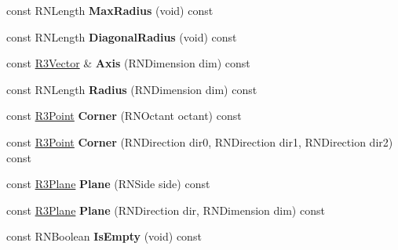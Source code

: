 \begin{DoxyCompactItemize}
\item 
const R\+N\+Length {\bfseries Max\+Radius} (void) const \hypertarget{class_r3_oriented_box_ad2d7be638bc52f27bc6592ad55dbe5e6}{}\label{class_r3_oriented_box_ad2d7be638bc52f27bc6592ad55dbe5e6}

\item 
const R\+N\+Length {\bfseries Diagonal\+Radius} (void) const \hypertarget{class_r3_oriented_box_ab749654a798015a22124ab60ae1599d0}{}\label{class_r3_oriented_box_ab749654a798015a22124ab60ae1599d0}

\item 
const \hyperlink{class_r3_vector}{R3\+Vector} \& {\bfseries Axis} (R\+N\+Dimension dim) const \hypertarget{class_r3_oriented_box_aadb9205a36799c7f8cb8fb307dc5206b}{}\label{class_r3_oriented_box_aadb9205a36799c7f8cb8fb307dc5206b}

\item 
const R\+N\+Length {\bfseries Radius} (R\+N\+Dimension dim) const \hypertarget{class_r3_oriented_box_ab1c602d81b7e2ad718cb8ed28019b0f0}{}\label{class_r3_oriented_box_ab1c602d81b7e2ad718cb8ed28019b0f0}

\item 
const \hyperlink{class_r3_point}{R3\+Point} {\bfseries Corner} (R\+N\+Octant octant) const \hypertarget{class_r3_oriented_box_a718fc57771ac9d97d7bcb3f04b1580e6}{}\label{class_r3_oriented_box_a718fc57771ac9d97d7bcb3f04b1580e6}

\item 
const \hyperlink{class_r3_point}{R3\+Point} {\bfseries Corner} (R\+N\+Direction dir0, R\+N\+Direction dir1, R\+N\+Direction dir2) const \hypertarget{class_r3_oriented_box_a40605c09890c36c20235681b9e7307ad}{}\label{class_r3_oriented_box_a40605c09890c36c20235681b9e7307ad}

\item 
const \hyperlink{class_r3_plane}{R3\+Plane} {\bfseries Plane} (R\+N\+Side side) const \hypertarget{class_r3_oriented_box_a520f8c9cd7ea8c58f4698c65f75184bc}{}\label{class_r3_oriented_box_a520f8c9cd7ea8c58f4698c65f75184bc}

\item 
const \hyperlink{class_r3_plane}{R3\+Plane} {\bfseries Plane} (R\+N\+Direction dir, R\+N\+Dimension dim) const \hypertarget{class_r3_oriented_box_a0e2a334dc9608a036e9a1527dd502c87}{}\label{class_r3_oriented_box_a0e2a334dc9608a036e9a1527dd502c87}

\item 
const R\+N\+Boolean {\bfseries Is\+Empty} (void) const \hypertarget{class_r3_oriented_box_abe3b32e3d68d8db3b143c96a7b6fb3dc}{}\label{class_r3_oriented_box_abe3b32e3d68d8db3b143c96a7b6fb3dc}


\end{DoxyCompactItemize}
